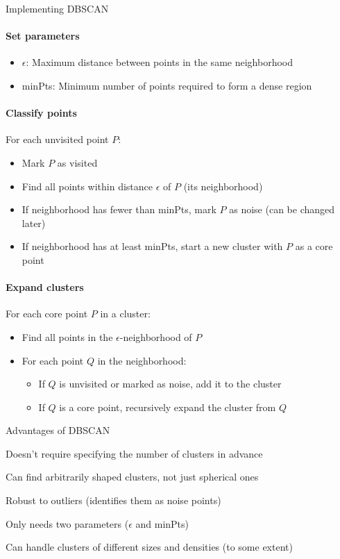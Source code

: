 \begin{KR}{Implementing DBSCAN}
\paragraph{Set parameters}
\begin{itemize}
    \item $\epsilon$: Maximum distance between points in the same neighborhood
    \item minPts: Minimum number of points required to form a dense region
\end{itemize}

\paragraph{Classify points}
For each unvisited point $P$:
\begin{itemize}
    \item Mark $P$ as visited
    \item Find all points within distance $\epsilon$ of $P$ (its neighborhood)
    \item If neighborhood has fewer than minPts, mark $P$ as noise (can be changed later)
    \item If neighborhood has at least minPts, start a new cluster with $P$ as a core point
\end{itemize}

\paragraph{Expand clusters}
For each core point $P$ in a cluster:
\begin{itemize}
    \item Find all points in the $\epsilon$-neighborhood of $P$
    \item For each point $Q$ in the neighborhood:
    \begin{itemize}
        \item If $Q$ is unvisited or marked as noise, add it to the cluster
        \item If $Q$ is a core point, recursively expand the cluster from $Q$
    \end{itemize}
\end{itemize}
\end{KR}


\begin{concept}{Advantages of DBSCAN}

    Doesn't require specifying the number of clusters in advance

    Can find arbitrarily shaped clusters, not just spherical ones

     Robust to outliers (identifies them as noise points)

     Only needs two parameters ($\epsilon$ and minPts)

     Can handle clusters of different sizes and densities (to some extent)

\end{concept}

